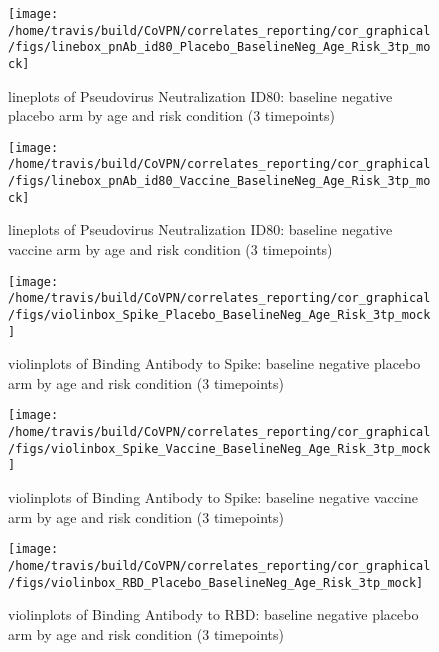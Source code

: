 \documentclass[]{book}
\theoremstyle{definition}
\theoremstyle{definition}
\theoremstyle{definition}
\newcommand{\1}{\mathbbm{1}}
\begin{document}
\clearpage
\begin{figure}[H]

{\centering \texttt{[image: /home/travis/build/CoVPN/correlates\_reporting/cor\_graphical/figs/linebox\_pnAb\_id80\_Placebo\_BaselineNeg\_Age\_Risk\_3tp\_mock]} 

}

\caption{lineplots of Pseudovirus Neutralization ID80: baseline negative placebo arm by age and risk condition (3 timepoints)}\label{fig:unnamed-chunk-145}
\end{figure}

\clearpage
\begin{figure}[H]

{\centering \texttt{[image: /home/travis/build/CoVPN/correlates\_reporting/cor\_graphical/figs/linebox\_pnAb\_id80\_Vaccine\_BaselineNeg\_Age\_Risk\_3tp\_mock]} 

}

\caption{lineplots of Pseudovirus Neutralization ID80: baseline negative vaccine arm by age and risk condition (3 timepoints)}\label{fig:unnamed-chunk-146}
\end{figure}

\clearpage
\begin{figure}[H]

{\centering \texttt{[image: /home/travis/build/CoVPN/correlates\_reporting/cor\_graphical/figs/violinbox\_Spike\_Placebo\_BaselineNeg\_Age\_Risk\_3tp\_mock]} 

}

\caption{violinplots of Binding Antibody to Spike: baseline negative placebo arm by age and risk condition (3 timepoints)}\label{fig:unnamed-chunk-147}
\end{figure}

\clearpage
\begin{figure}[H]

{\centering \texttt{[image: /home/travis/build/CoVPN/correlates\_reporting/cor\_graphical/figs/violinbox\_Spike\_Vaccine\_BaselineNeg\_Age\_Risk\_3tp\_mock]} 

}

\caption{violinplots of Binding Antibody to Spike: baseline negative vaccine arm by age and risk condition (3 timepoints)}\label{fig:unnamed-chunk-148}
\end{figure}

\clearpage
\begin{figure}[H]

{\centering \texttt{[image: /home/travis/build/CoVPN/correlates\_reporting/cor\_graphical/figs/violinbox\_RBD\_Placebo\_BaselineNeg\_Age\_Risk\_3tp\_mock]} 

}

\caption{violinplots of Binding Antibody to RBD: baseline negative placebo arm by age and risk condition (3 timepoints)}\label{fig:unnamed-chunk-149}
\end{figure}
\end{document}
